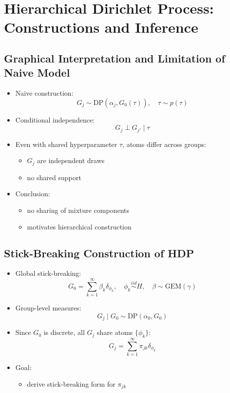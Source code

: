 \documentclass[12pt,oneside]{book}
\numberwithin{equation}{section}
\theoremstyle{definition}
\theoremstyle{plain}
\theoremstyle{remark}
\begin{document}
\section{Hierarchical Dirichlet Process: Constructions and Inference}

\subsection*{Graphical Interpretation and Limitation of Naive Model}

\begin{itemize}
\item Naive construction:
\[
G_j \sim \text{DP}(\alpha_j, G_0(\tau)), \quad \tau \sim p(\tau)
\]

\item Conditional independence:
\[
G_j \perp G_{j'} \mid \tau
\]

\item Even with shared hyperparameter $\tau$, atoms differ across groups:
\begin{itemize}
\item $G_j$ are independent draws
\item no shared support
\end{itemize}

\item Conclusion:
\begin{itemize}
\item no sharing of mixture components
\item motivates hierarchical construction
\end{itemize}
\end{itemize}

\subsection{Stick-Breaking Construction of HDP}

\begin{itemize}
\item Global stick-breaking:
\[
G_0 = \sum_{k=1}^{\infty} \beta_k \delta_{\phi_k}, \quad \phi_k \overset{iid}{\sim} H, \quad \beta \sim \text{GEM}(\gamma)
\]

\item Group-level measures:
\[
G_j \mid G_0 \sim \text{DP}(\alpha_0, G_0)
\]

\item Since $G_0$ is discrete, all $G_j$ share atoms $\{\phi_k\}$:
\[
G_j = \sum_{k=1}^{\infty} \pi_{jk} \delta_{\phi_k}
\]

\item Goal:
\begin{itemize}
\item derive stick-breaking form for $\pi_{jk}$
\end{itemize}
\end{itemize}
\end{document}
